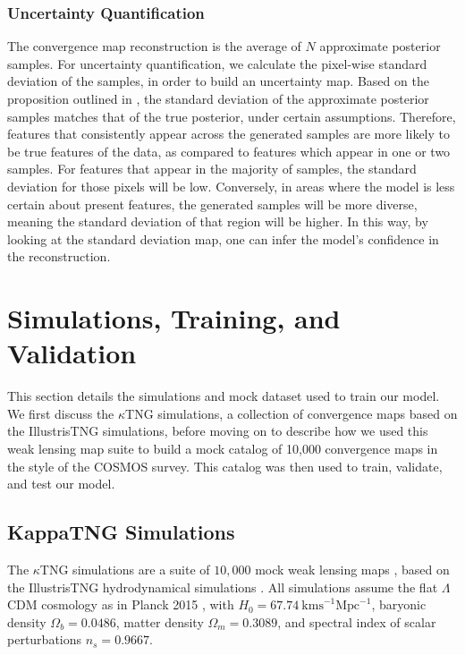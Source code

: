 \documentclass[fleqn,usenatbib]{mnras}
\begin{document}
\subsubsection{Uncertainty Quantification}\label{subsubsec:uncertainty_quantification}

The convergence map reconstruction is the average of $N$ approximate posterior samples. For uncertainty quantification, 
we calculate the pixel-wise standard deviation of the samples, in order to build an uncertainty map.
Based on the proposition outlined in \citet{bendel2024regularized}, the standard deviation of the approximate posterior samples matches that of the true posterior, under certain assumptions. Therefore, features that consistently appear across the generated samples are more likely to be true features of the data, as compared to features which appear in one or two samples. For features that appear in the majority of samples, 
the standard deviation for those pixels will be low. Conversely, in areas where the model is less 
certain about present features, the generated samples will be more diverse, meaning the standard 
deviation of that region will be higher. In this way, by looking at the standard deviation map,
one can infer the model's confidence in the reconstruction.

\section{Simulations, Training, and Validation}\label{sec:simulations_data}

This section details the simulations and mock dataset used to train our model. We first discuss the $\kappa$TNG simulations, a collection of convergence maps based on the IllustrisTNG simulations, before moving on to describe how we used this weak lensing map suite to build a mock catalog of 10,000 convergence maps in the style of the COSMOS survey. This catalog was then used to train, validate, and test our model.

\subsection{KappaTNG Simulations}\label{subsec:kappatng}

The $\kappa$TNG simulations are a suite of $10,000$ mock weak lensing maps \citep{osato2021kappatng}, 
based on the IllustrisTNG hydrodynamical simulations \citep{springel2018first}. All 
simulations assume the flat $\Lambda$CDM cosmology as in Planck 2015 \citep{ade2016planck}, 
with $H_0 = 67.74 \: \text{kms}^{-1}\text{Mpc}^{-1}$, baryonic density $\Omega_b = 0.0486$, 
matter density $\Omega_m = 0.3089$, and spectral index of scalar perturbations $n_s = 0.9667$.
\end{document}
